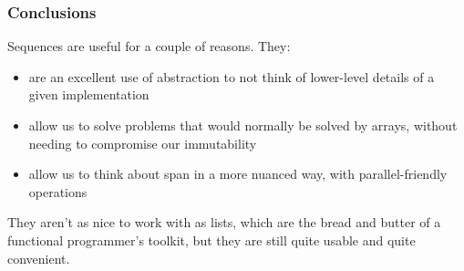 \documentclass[aspectratio=169, handout]{beamer}
\newcommand{\fhex}[3][]{\node[hex, #1, fill=hexcolor, minimum width=0.4in] (#2) {#3}}
\begin{document}
\begin{frame}[fragile]
  \frametitle{Conclusions}

  Sequences are useful for a couple of reasons. They:
  \begin{itemize}
    \item are an excellent use of abstraction to not think of lower-level
    details of a given implementation
    \item allow us to solve problems that would normally be solved by arrays,
    without needing to compromise our immutability
    \item allow us to think about span in a more nuanced way, with parallel-friendly
    operations
  \end{itemize}

  \vspace{\fill}

  They aren't as nice to work with as lists, which are the bread and butter of
  a functional programmer's toolkit, but they are still quite usable and quite
  convenient.
\end{frame}












\end{document}
